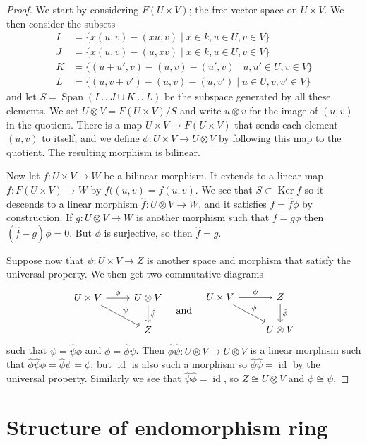 \documentclass[11pt]{article}
\theoremstyle{definition}
\DeclareMathOperator{\Span}{Span}
\DeclareMathOperator{\Ker}{Ker}
\DeclareMathOperator{\id}{id}
\begin{document}
\begin{proof}
We start by considering $F(U \times V)$; the free vector space on $U \times V$.
We then consider the subsets
\begin{align*}
I &= \{ x (u, v) - (xu, v) \mid x \in k, u \in U, v \in V \}
\\
J &= \{ x (u, v) - (u, xv) \mid x \in k, u \in U, v \in V \}
\\
K &= \{ (u+u', v) - (u, v) - (u',v) \mid u, u' \in U, v \in V \}
\\
L &= \{ (u, v+v') - (u, v) - (u,v') \mid u \in U, v, v' \in V \}
\end{align*}
and let $S = \Span(I \cup J \cup K \cup L)$ be the subspace generated by all these elements.
We set $U \otimes V = F(U \times V) / S$ and write $u \otimes v$ for the image of $(u, v)$ in the quotient.
There is a map $U \times V \to F(U \times V)$ that sends each element $(u, v)$ to itself, and we define $\phi : U \times V \to U \otimes V$ by following this map to the quotient.
The resulting morphism is bilinear.

Now let $f: U \times V \to W$ be a bilinear morphism.
It extends to a linear map $\tilde f : F(U \times V) \to W$ by $\tilde f((u, v) = f(u, v)$.
We see that $S \subset \Ker \tilde f$ so it descends to a linear morphism $\hat f : U \otimes V \to W$, and it satisfies $f = \hat f \phi$ by construction.
If $g : U \otimes V \to W$ is another morphism such that $f = g \phi$ then $(\hat f - g) \phi = 0$.
But $\phi$ is surjective, so then $\hat f = g$.

Suppose now that $\psi : U \times V \to Z$ is another space and morphism that satisfy the universal property.
We then get two commutative diagrams
\[
\begin{tikzcd}
U \times V \ar[dr,"\psi"] \ar[r,"\phi"] & U \otimes V \ar[d,"\hat\psi"]
\\
                         & Z
\end{tikzcd}
\quad\text{and}\quad
\begin{tikzcd}
U \times V \ar[dr,"\phi"] \ar[r,"\psi"] & Z \ar[d,"\hat\phi"]
\\
                         & U \otimes V
\end{tikzcd}
\]
such that $\psi = \hat\psi \phi$ and $\phi = \hat\phi \psi$.
Then $\hat\phi \hat\psi : U \otimes V \to U \otimes V$ is a linear morphism such that $\hat\phi \hat\psi \phi = \hat\phi \psi = \phi$; but $\id$ is also such a morphism so $\hat\phi \hat\psi = \id$ by the universal property.
Similarly we see that $\hat\psi \hat\phi = \id$, so $Z \cong U \otimes V$ and $\phi \cong \psi$.
\end{proof}





\section{Structure of endomorphism ring}
\end{document}
